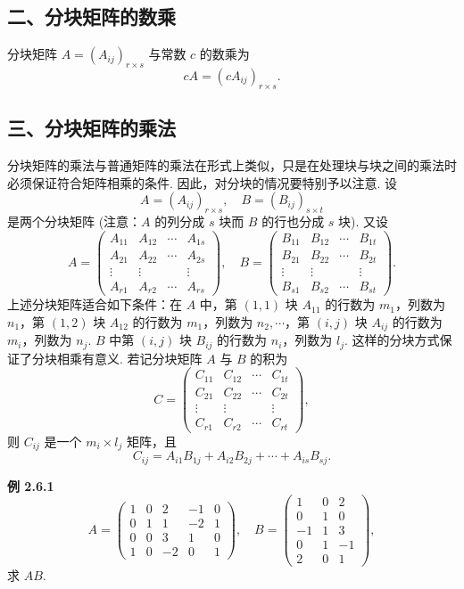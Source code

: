 \documentclass[UTF8, 12pt, fontset=fandol, oneside]{ctexart}
\begin{document}
\subsection*{二、分块矩阵的数乘}

分块矩阵 $A=(A_{ij})_{r\times s}$ 与常数 $c$ 的数乘为
\[
cA=(cA_{ij})_{r\times s}.
\]

\subsection*{三、分块矩阵的乘法}

分块矩阵的乘法与普通矩阵的乘法在形式上类似，只是在处理块与块之间的乘法时必须保证符合矩阵相乘的条件. 因此，对分块的情况要特别予以注意. 设
\[
A=(A_{ij})_{r\times s},\quad B=(B_{ij})_{s\times t}
\]
是两个分块矩阵 (注意：$A$ 的列分成 $s$ 块而 $B$ 的行也分成 $s$ 块). 又设
\[
A=\left(\begin{array}{cccc}
A_{11} & A_{12} & \cdots & A_{1s}\\
A_{21} & A_{22} & \cdots & A_{2s}\\
\vdots & \vdots & & \vdots\\
A_{r1} & A_{r2} & \cdots & A_{rs}
\end{array}\right),\quad
B=\left(\begin{array}{cccc}
B_{11} & B_{12} & \cdots & B_{1t}\\
B_{21} & B_{22} & \cdots & B_{2t}\\
\vdots & \vdots & & \vdots\\
B_{s1} & B_{s2} & \cdots & B_{st}
\end{array}\right).
\]
上述分块矩阵适合如下条件：在 $A$ 中，第 $(1,1)$ 块 $A_{11}$ 的行数为 $m_1$，列数为 $n_1$，第 $(1,2)$ 块 $A_{12}$ 的行数为 $m_1$，列数为 $n_2,\cdots$，第 $(i,j)$ 块 $A_{ij}$ 的行数为 $m_i$，列数为 $n_j$. $B$ 中第 $(i,j)$ 块 $B_{ij}$ 的行数为 $n_i$，列数为 $l_j$. 这样的分块方式保证了分块相乘有意义. 若记分块矩阵 $A$ 与 $B$ 的积为
\[
C=\left(\begin{array}{cccc}
C_{11} & C_{12} & \cdots & C_{1t}\\
C_{21} & C_{22} & \cdots & C_{2t}\\
\vdots & \vdots & & \vdots\\
C_{r1} & C_{r2} & \cdots & C_{rt}
\end{array}\right),
\]
则 $C_{ij}$ 是一个 $m_i\times l_j$ 矩阵，且
\[
C_{ij}=A_{i1}B_{1j}+A_{i2}B_{2j}+\cdots+A_{is}B_{sj}.
\]

\noindent\textbf{例 2.6.1}\quad
\[
A=\left(\begin{array}{cc|c|cc}
1 & 0 & 2 & -1 & 0\\
0 & 1 & 1 & -2 & 1\\ \hline
0 & 0 & 3 & 1 & 0\\
1 & 0 & -2 & 0 & 1
\end{array}\right),\quad
B=\left(\begin{array}{cc|c}
1 & 0 & 2\\
0 & 1 & 0\\ \hline
-1 & 1 & 3\\ \hline
0 & 1 & -1\\
2 & 0 & 1
\end{array}\right),
\]
求 $AB$.
\end{document}
